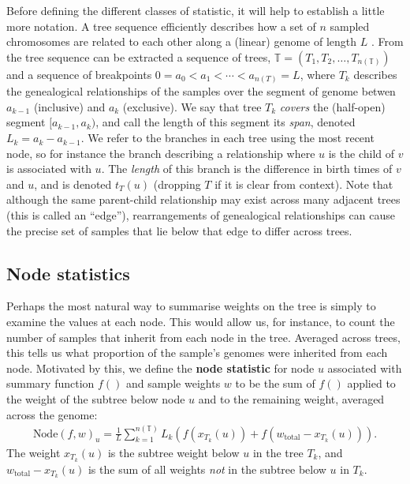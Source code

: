 \documentclass{article}
\newcommand{\node}{\mbox{Node}} %
\newcommand{\treeseq}{\mathbb{T}} %
\newcommand{\iw}{w} %
\newcommand{\tiw}{w_\text{total}} %
\newcommand{\nw}{x} %
\begin{document}
Before defining the different classes of statistic,
it will help to establish a little more notation.
A tree sequence efficiently describes how a set of $n$ sampled chromosomes
are related to each other along a (linear) genome of length $L$ \citep{kelleher2016efficient,kelleher2018efficient}.
From the tree sequence can be extracted a sequence of trees,
$\treeseq = (T_1, T_2, \ldots, T_{n(\treeseq)})$
and a sequence of breakpoints $0 = a_0 < a_1 < \cdots < a_{n(T)} = L$,
where $T_k$ describes the genealogical relationships of the samples
over the segment of genome betwen $a_{k-1}$ (inclusive) and $a_k$ (exclusive).
We say that tree $T_k$ \emph{covers} the (half-open) segment $[a_{k-1}, a_k)$,
and call the length of this segment its \emph{span}, denoted $L_k = a_k - a_{k-1}$.
We refer to the branches in each tree using the most recent node,
so for instance the branch describing a relationship where $u$ is the child of $v$
is associated with $u$.
The \emph{length} of this branch is the difference in birth times of $v$ and $u$,
and is denoted $t_T(u)$ (dropping $T$ if it is clear from context).
Note that although the same parent-child relationship may exist across many adjacent trees
(this is called an ``edge''),
rearrangements of genealogical relationships
can cause the precise set of samples that lie below that edge to differ across
trees.


\subsection*{Node statistics}

Perhaps the most natural way to summarise weights on the tree
is simply to examine the values at each node.
This would allow us, for instance, to
count the number of samples that inherit from each node in the tree.
Averaged across trees,
this tells us what proportion of the sample's genomes were inherited from each node.
Motivated by this, we define the
\textbf{node statistic} for node $u$
associated with summary function $f()$ and sample weights $\iw$
to be the sum of $f()$ applied to the weight of the subtree below node $u$
and to the remaining weight,
averaged across the genome:
\begin{align}
    \node(f, \iw)_u
    =
    \frac{1}{L} \sum_{k=1}^{n(\treeseq)} L_k \left( f(\nw_{T_k}(u)) + f(\tiw - \nw_{T_k}(u)) \right).
\end{align}
The weight $\nw_{T_k}(u)$ is the subtree weight below $u$ in the tree $T_k$,
and $\tiw - \nw_{T_k}(u)$ is the sum of all weights \emph{not} in the subtree below $u$ in $T_k$.
\end{document}
